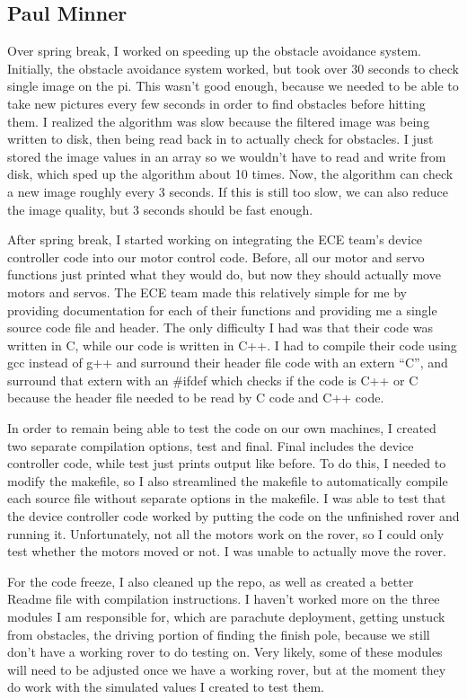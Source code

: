 \documentclass[10pt,letterpaper,onecolumn,draftclsnofoot,journal]{IEEEtran}
\begin{document}
\subsection{\textbf{Paul Minner}}
Over spring break, I worked on speeding up the obstacle avoidance system. Initially, the obstacle avoidance system worked, but took over 30 seconds to check single image on the pi. This wasn't good enough, because we needed to be able to take new pictures every few seconds in order to find obstacles before hitting them. I realized the algorithm was slow because the filtered image was being written to disk, then being read back in to actually check for obstacles. I just stored the image values in an array so we wouldn't have to read and write from disk, which sped up the algorithm about 10 times. Now, the algorithm can check a new image roughly every 3 seconds. If this is still too slow, we can also reduce the image quality, but 3 seconds should be fast enough.\vspace{.3cm}
\par
After spring break, I started working on integrating the ECE team's device controller code into our motor control code. Before, all our motor and servo functions just printed what they would do, but now they should actually move motors and servos. The ECE team made this relatively simple for me by providing documentation for each of their functions and providing me a single source code file and header. The only difficulty I had was that their code was written in C, while our code is written in C++. I had to compile their code using gcc instead of g++ and surround their header file code with an extern ``C'', and surround that extern with an \#ifdef which checks if the code is C++ or C because the header file needed to be read by C code and C++ code.\vspace{.3cm}
\par
In order to remain being able to test the code on our own machines, I created two separate compilation options, test and final. Final includes the device controller code, while test just prints output like before. To do this, I needed to modify the makefile, so I also streamlined the makefile to automatically compile each source file without separate options in the makefile. I was able to test that the device controller code worked by putting the code on the unfinished rover and running it. Unfortunately, not all the motors work on the rover, so I could only test whether the motors moved or not. I was unable to actually move the rover.\vspace{.3cm}
\par
For the code freeze, I also cleaned up the repo, as well as created a better Readme file with compilation instructions. I haven't worked more on the three modules I am responsible for, which are parachute deployment, getting unstuck from obstacles, the driving portion of finding the finish pole, because we still don't have a working rover to do testing on. Very likely, some of these modules will need to be adjusted once we have a working rover, but at the moment they do work with the simulated values I created to test them.\vspace{.3cm}
\end{document}
